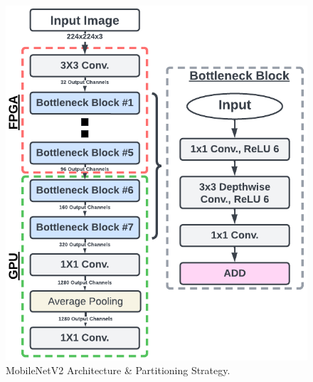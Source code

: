 
\begin{figure}[h]
\centering
  \includegraphics[width=0.6\columnwidth]{Images/MobilnetV2.png}
    \caption{MobileNetV2 Architecture \& Partitioning Strategy.}
    \label{fig:MobileNetV2Architectures}
\end{figure}



